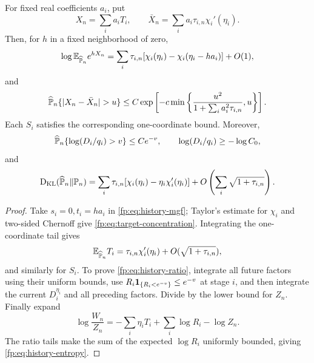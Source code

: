 \begin{proposition}\label{fp:prop:history-target}
For fixed real coefficients $a_i$, put
\[
 X_n=\sum_i a_iT_i,\qquad
 \bar X_n=\sum_i a_i\tau_{i,n}\chi_i'(\eta_i).
\]
Then, for $h$ in a fixed neighborhood of zero,
\begin{equation}\label{fp:eq:target-spectrum}
 \log\mathbb E_{\widehat{\mathbb P}_n}e^{hX_n}
 =\sum_i\tau_{i,n}[\chi_i(\eta_i)-\chi_i(\eta_i-ha_i)]+O(1),
\end{equation}
and
\begin{equation}\label{fp:eq:target-concentration}
 \widehat\PP_n\{|X_n-\bar X_n|>u\}
 \le C\exp\left[-c\min\left\{
 \frac{u^2}{1+\sum_i a_i^2\tau_{i,n}},u\right\}\right].
\end{equation}
Each $S_i$ satisfies the corresponding one-coordinate bound. Moreover,
\begin{equation}\label{fp:eq:history-ratio}
 \widehat{\mathbb P}_n\{\log(D_i/q_i)>v\}\le Ce^{-v},\qquad
 \log(D_i/q_i)\ge-\log C_0,
\end{equation}
and
\begin{equation}\label{fp:eq:history-entropy}
 \operatorname{D_{\mathrm{KL}}}(\widehat{\mathbb P}_n\Vert\mathbb P_n)
 =\sum_i\tau_{i,n}[\chi_i(\eta_i)-\eta_i\chi_i'(\eta_i)]
 +O\left(\sum_i\sqrt{1+\tau_{i,n}}\right).
\end{equation}
\end{proposition}
\begin{proof}
Take $s_i=0,t_i=ha_i$ in \eqref{fp:eq:history-mgf}; Taylor's estimate for $\chi_i$ and two-sided Chernoff give \eqref{fp:eq:target-concentration}. Integrating the one-coordinate tail gives
\[
 \mathbb E_{\widehat{\mathbb P}_n}T_i
 =\tau_{i,n}\chi_i'(\eta_i)+O(\sqrt{1+\tau_{i,n}}),
\]
and similarly for $S_i$. To prove \eqref{fp:eq:history-ratio}, integrate all future factors using their uniform bounds, use $R_i\mathbf 1_{\{R_i<e^{-v}\}}\le e^{-v}$ at stage $i$, and then integrate the current $D_i^{\eta_i}$ and all preceding factors. Divide by the lower bound for $Z_n$. Finally expand
\[
 \log\frac{W_n}{Z_n}
 =-\sum_i\eta_iT_i+\sum_i\log R_i-\log Z_n.
\]
The ratio tails make the sum of the expected $\log R_i$ uniformly bounded, giving \eqref{fp:eq:history-entropy}.
\end{proof}

